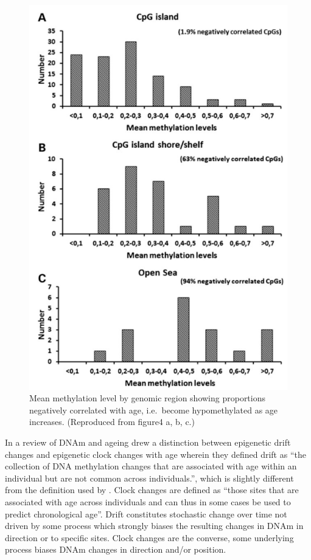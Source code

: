 \documentclass[]{book}
\begin{document}
\begin{figure}
\includegraphics[width=6.94in]{figs/Florath2014_F4abc} \caption{Mean methylation level by genomic region showing proportions negatively correlated with age, i.e.~become hypomethylated as age increases.
(Reproduced from \citet{Florath2014} figure4 a, b, c.)}\label{fig:Florath2014F4abc}
\end{figure}




In a review of DNAm and ageing \citet{Jones2015} drew a distinction between epigenetic drift changes and epigenetic clock changes with age wherein they defined drift as ``the collection of DNA methylation changes that are associated with age within an individual but are not common across individuals.'', which is slightly different from the definition used by \citet{Fraga2005}. Clock changes are defined as ``those sites that are associated with age across individuals and can thus in some cases be used to predict chronological age''. Drift constitutes stochastic change over time not driven by some process which strongly biases the resulting changes in DNAm in direction or to specific sites. Clock changes are the converse, some underlying process biases DNAm changes in direction and/or position.
\end{document}
